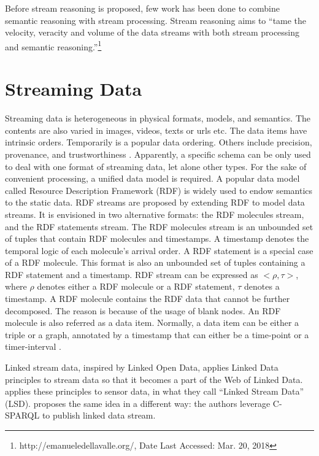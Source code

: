 Before stream reasoning \cite{della2009s} is proposed, few work has been done to combine semantic reasoning with stream processing. 
Stream reasoning aims to ``tame the velocity, veracity and volume of the data streams with both stream processing and semantic reasoning.''\footnote{http://emanueledellavalle.org/, Date Last Accessed: Mar. 20, 2018}
%
\section{Streaming Data}
Streaming data is heterogeneous in physical formats, models, and semantics.
The contents are also varied in images, videos, texts or urls etc.
The data items have intrinsic orders.
Temporarily is a popular data ordering. 
Others include precision, provenance, and trustworthiness \cite{della2013order}.
Apparently, a specific schema can be only used to deal with one format of streaming data, let alone other types. 
For the sake of convenient processing, a unified data model is required.
A popular data model called Resource Description Framework (RDF) is widely used to endow semantics to the static data.
RDF streams \cite{della2009first} are proposed by extending RDF to model data streams. 
It is envisioned in two alternative formats: the RDF molecules stream, and the RDF statements stream.
The RDF molecules stream is an unbounded set of tuples that contain RDF molecules \cite{ding2005tracking} and timestamps.
A timestamp denotes the temporal logic of each molecule's arrival order.
A RDF statement is a special case of a RDF molecule.
This format is also an unbounded set of tuples containing a RDF statement and a timestamp. 
RDF stream can be expressed as $<\rho , \tau>$, where $\rho$ denotes either a RDF molecule or a RDF statement, $\tau$ denotes a timestamp.
A RDF molecule contains the RDF data that cannot be further decomposed. 
The reason is because of the usage of blank nodes.
An RDF molecule is also referred as a data item. 
Normally, a data item can be either a triple or a graph, annotated by a timestamp that can either be a time-point or a timer-interval \cite{srtutorial}. 

Linked stream data, inspired by Linked Open Data, applies Linked Data principles \cite{bizer2008linked} to stream data so that it becomes a part of the Web of Linked Data.
\cite{sequeda2009linked} applies these principles to sensor data, in what they call ``Linked Stream Data'' (LSD). 
\cite{barbieri2010proposal} proposes the same idea in a different way: 
the authors leverage C-SPARQL \cite{barbieri2009c} to publish linked data stream.

